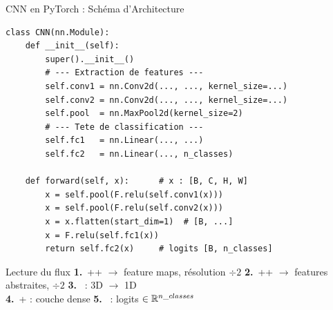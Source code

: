 \documentclass[aspectratio=169, 10pt]{beamer}
\begin{document}
\begin{frame}[fragile]{CNN en PyTorch : Schéma d'Architecture}
  \begin{lstlisting}[style=pythonstyle, basicstyle=\ttfamily\scriptsize]
class CNN(nn.Module):
    def __init__(self):
        super().__init__()
        # --- Extraction de features ---
        self.conv1 = nn.Conv2d(..., ..., kernel_size=...)
        self.conv2 = nn.Conv2d(..., ..., kernel_size=...)
        self.pool  = nn.MaxPool2d(kernel_size=2)
        # --- Tete de classification ---
        self.fc1   = nn.Linear(..., ...)
        self.fc2   = nn.Linear(..., n_classes)

    def forward(self, x):      # x : [B, C, H, W]
        x = self.pool(F.relu(self.conv1(x)))
        x = self.pool(F.relu(self.conv2(x)))
        x = x.flatten(start_dim=1)  # [B, ...]
        x = F.relu(self.fc1(x))
        return self.fc2(x)     # logits [B, n_classes]
  \end{lstlisting}
  \begin{block}{Lecture du flux}
    \footnotesize
    \textbf{1.}~++ $\to$ feature maps, résolution $\div 2$ \enspace
    \textbf{2.}~++ $\to$ features abstraites, $\div 2$ \enspace
    \textbf{3.}~ : 3D $\to$ 1D \\[2pt]
    \textbf{4.}~+ : couche dense \enspace
    \textbf{5.}~ : logits $\in \mathbb{R}^{n\_classes}$
  \end{block}
\end{frame}
\end{document}
